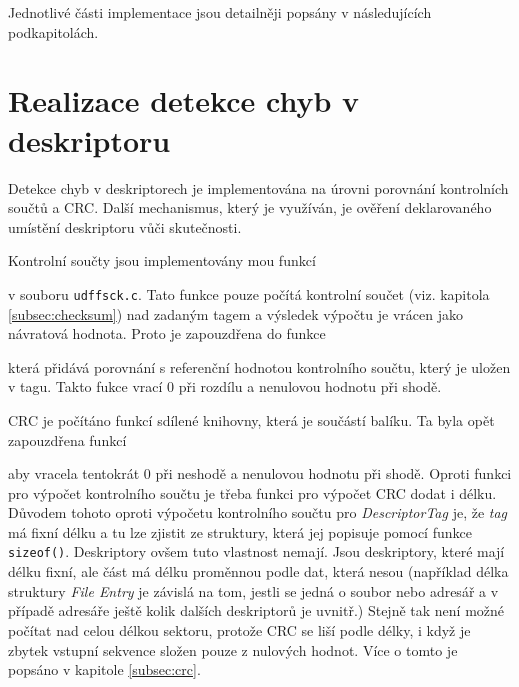 Jednotlivé části implementace jsou detailněji popsány v následujících podkapitolách.

\section{Realizace detekce chyb v deskriptoru}
\label{sec:realizace-detekce}
Detekce chyb v deskriptorech je implementována na úrovni porovnání kontrolních součtů a CRC. Další mechanismus, který je využíván, je ověření deklarovaného umístění deskriptoru vůči skutečnosti.

Kontrolní součty jsou implementovány mou funkcí

\centerline{\texttt{}}

v souboru \texttt{udffsck.c}. Tato funkce pouze počítá kontrolní součet (viz. kapitola \ref{subsec:checksum}) nad zadaným tagem a výsledek výpočtu je vrácen jako návratová hodnota. Proto je zapouzdřena do funkce
 
\centerline{\texttt{}}

která přidává porovnání s referenční hodnotou kontrolního součtu, který je uložen v tagu. Takto fukce vrací 0 při rozdílu a nenulovou hodnotu při shodě.

CRC je počítáno funkcí sdílené knihovny, která je součástí balíku. Ta byla opět zapouzdřena funkcí

\centerline{\texttt{}}

aby vracela tentokrát 0 při neshodě a nenulovou hodnotu při shodě. Oproti funkci pro výpočet kontrolního součtu je třeba funkci pro výpočet CRC dodat i délku. Důvodem tohoto oproti výpočetu kontrolního součtu pro \textit{DescriptorTag} je, že \textit{tag} má fixní délku a tu lze zjistit ze struktury, která jej popisuje pomocí funkce \texttt{sizeof()}. Deskriptory ovšem tuto vlastnost nemají. Jsou deskriptory, které mají délku fixní, ale část má délku proměnnou podle dat, která nesou (například délka struktury \textit{File Entry} je závislá na tom, jestli se jedná o soubor nebo adresář a v případě adresáře ještě kolik dalších deskriptorů je uvnitř.) Stejně tak není možné počítat nad celou délkou sektoru, protože CRC se liší podle délky, i když je zbytek vstupní sekvence složen pouze z nulových hodnot. Více o tomto je popsáno v kapitole \ref{subsec:crc}.

